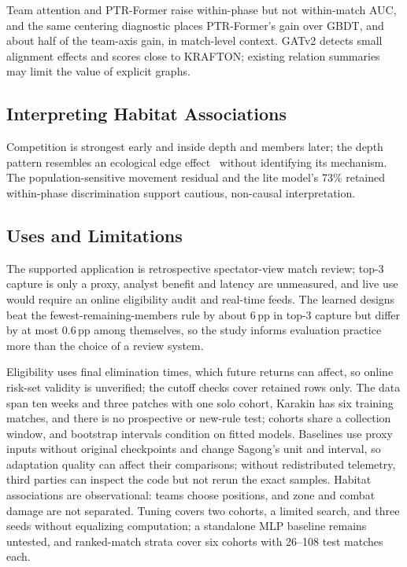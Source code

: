 \documentclass[sigconf,anonymous,nonacm]{acmart}
\begin{document}
Team attention and PTR-Former raise within-phase but not within-match AUC, and the same centering diagnostic places PTR-Former's gain over GBDT, and about half of the team-axis gain, in match-level context. GATv2 detects small alignment effects and scores close to KRAFTON; existing relation summaries may limit the value of explicit graphs.

\subsection{Interpreting Habitat Associations}
Competition is strongest early and inside depth and members later; the depth pattern resembles an ecological edge effect~\cite{Ries04} without identifying its mechanism. The population-sensitive movement residual and the lite model's 73\% retained within-phase discrimination support cautious, non-causal interpretation.

\subsection{Uses and Limitations}
\label{sec:discussion:limits}
The supported application is retrospective spectator-view match review; top-3 capture is only a proxy, analyst benefit and latency are unmeasured, and live use would require an online eligibility audit and real-time feeds. The learned designs beat the fewest-remaining-members rule by about 6\,pp in top-3 capture but differ by at most 0.6\,pp among themselves, so the study informs evaluation practice more than the choice of a review system.

Eligibility uses final elimination times, which future returns can affect, so online risk-set validity is unverified; the cutoff checks cover retained rows only. The data span ten weeks and three patches with one solo cohort, Karakin has six training matches, and there is no prospective or new-rule test; cohorts share a collection window, and bootstrap intervals condition on fitted models. Baselines use proxy inputs without original checkpoints and change Sagong's unit and interval, so adaptation quality can affect their comparisons; without redistributed telemetry, third parties can inspect the code but not rerun the exact samples. Habitat associations are observational: teams choose positions, and zone and combat damage are not separated. Tuning covers two cohorts, a limited search, and three seeds without equalizing computation; a standalone MLP baseline remains untested, and ranked-match strata cover six cohorts with 26--108 test matches each.
\end{document}
